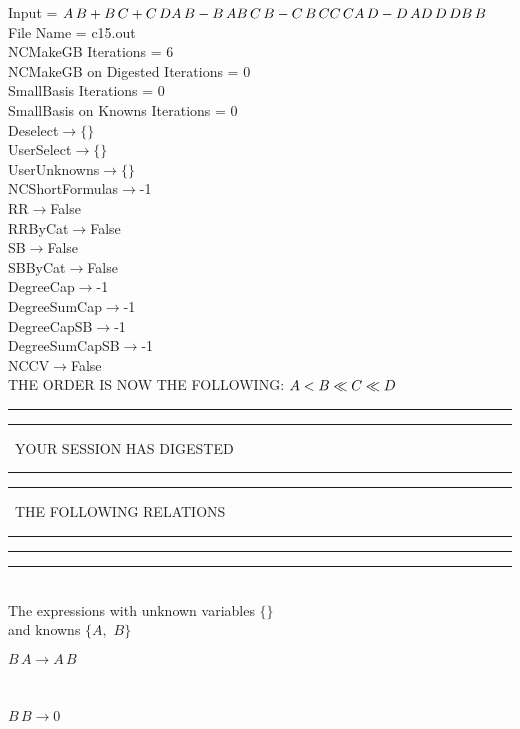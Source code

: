 \documentclass[rep10,leqno]{report}
\begin{document}
\normalsize
\baselineskip=12pt
\noindent
Input = 
$
\\A\,
 B + B\,
 C + C\,
 D\\
A\,
 B - B\,
 A\\
B\,
 C\,
 B - C\,
 B\,
 C\\
C\,
 C\\
A\,
 D - D\,
 A\\
D\,
 D\,
 D\\
B\,
 B\\
$
File Name = c15.out\\
NCMakeGB Iterations = 6\\
NCMakeGB on Digested Iterations = 0\\
SmallBasis Iterations = 0\\
SmallBasis on Knowns Iterations = 0\\
Deselect$\rightarrow \{\}$\\
UserSelect$\rightarrow \{\}$\\
UserUnknowns$\rightarrow \{\}$\\
NCShortFormulas$\rightarrow$-1\\
RR$\rightarrow $False\\
RRByCat$\rightarrow $False\\
SB$\rightarrow $False\\
SBByCat$\rightarrow $False\\
DegreeCap$\rightarrow $-1\\
DegreeSumCap$\rightarrow $-1\\
DegreeCapSB$\rightarrow $-1\\
DegreeSumCapSB$\rightarrow $-1\\
NCCV$\rightarrow $False\\
THE ORDER IS NOW THE FOLLOWING:\hfil\break
$
A<B\ll
C\ll
D\\
$
\rule[2pt]{6in}{4pt}\hfil\break
\rule[2pt]{1.879in}{4pt}
\ YOUR SESSION HAS DIGESTED\ 
\rule[2pt]{1.879in}{4pt}\hfil\break
\rule[2pt]{1.923in}{4pt}
\ THE FOLLOWING RELATIONS\ 
\rule[2pt]{1.923in}{4pt}\hfil\break
\rule[2pt]{6in}{4pt}\hfil\break
\rule[3pt]{6in}{.7pt}\\
The expressions with unknown variables $\{\}$\\
and knowns $\{A,
$ $
B\}$\smallskip\\
\begin{minipage}{6in}
$
B\,
 A\rightarrow A\,
 B
$
\end{minipage}\medskip \\
\begin{minipage}{6in}
$
B\,
 B\rightarrow 0
$
\end{minipage}\\
\end{document}

